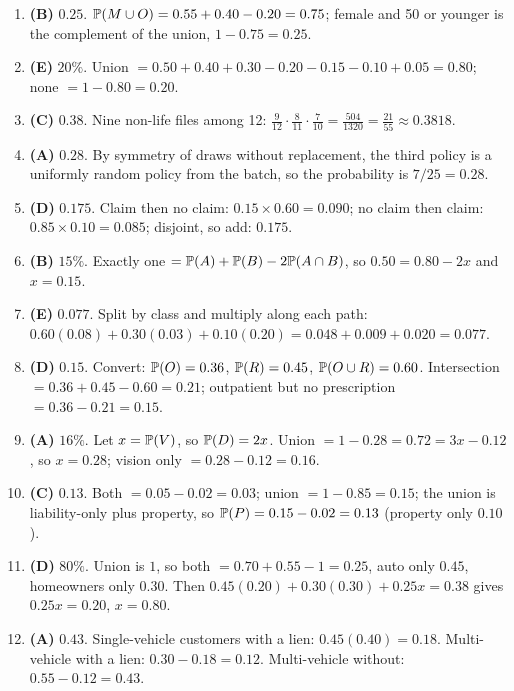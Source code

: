 \begin{enumerate}[leftmargin=2em]
  \item \textbf{(B)} $0.25$. $\mathbb{P}(M \cup O) = 0.55 + 0.40 - 0.20 = 0.75$; female and 50 or younger
  is the complement of the union, $1 - 0.75 = 0.25$.
  \item \textbf{(E)} $20\%$. Union $= 0.50 + 0.40 + 0.30 - 0.20 - 0.15 - 0.10 + 0.05 = 0.80$; none
  $= 1 - 0.80 = 0.20$.
  \item \textbf{(C)} $0.38$. Nine non-life files among 12: $\frac{9}{12}\cdot\frac{8}{11}\cdot\frac{7}{10}
  = \frac{504}{1320} = \frac{21}{55} \approx 0.3818$.
  \item \textbf{(A)} $0.28$. By symmetry of draws without replacement, the third policy is a uniformly
  random policy from the batch, so the probability is $7/25 = 0.28$.
  \item \textbf{(D)} $0.175$. Claim then no claim: $0.15 \times 0.60 = 0.090$; no claim then claim:
  $0.85 \times 0.10 = 0.085$; disjoint, so add: $0.175$.
  \item \textbf{(B)} $15\%$. Exactly one $= \mathbb{P}(A) + \mathbb{P}(B) - 2\mathbb{P}(A \cap B)$, so
  $0.50 = 0.80 - 2x$ and $x = 0.15$.
  \item \textbf{(E)} $0.077$. Split by class and multiply along each path:
  $0.60(0.08) + 0.30(0.03) + 0.10(0.20) = 0.048 + 0.009 + 0.020 = 0.077$.
  \item \textbf{(D)} $0.15$. Convert: $\mathbb{P}(O) = 0.36$, $\mathbb{P}(R) = 0.45$, $\mathbb{P}(O \cup R) = 0.60$.
  Intersection $= 0.36 + 0.45 - 0.60 = 0.21$; outpatient but no prescription $= 0.36 - 0.21 = 0.15$.
  \item \textbf{(A)} $16\%$. Let $x = \mathbb{P}(V)$, so $\mathbb{P}(D) = 2x$. Union $= 1 - 0.28 = 0.72 =
  3x - 0.12$, so $x = 0.28$; vision only $= 0.28 - 0.12 = 0.16$.
  \item \textbf{(C)} $0.13$. Both $= 0.05 - 0.02 = 0.03$; union $= 1 - 0.85 = 0.15$; the union is
  liability-only plus property, so $\mathbb{P}(P) = 0.15 - 0.02 = 0.13$ (property only $0.10$).
  \item \textbf{(D)} $80\%$. Union is $1$, so both $= 0.70 + 0.55 - 1 = 0.25$, auto only $0.45$,
  homeowners only $0.30$. Then $0.45(0.20) + 0.30(0.30) + 0.25x = 0.38$ gives $0.25x = 0.20$, $x = 0.80$.
  \item \textbf{(A)} $0.43$. Single-vehicle customers with a lien: $0.45(0.40) = 0.18$.
  Multi-vehicle with a lien: $0.30 - 0.18 = 0.12$. Multi-vehicle without: $0.55 - 0.12 = 0.43$.
\end{enumerate}

